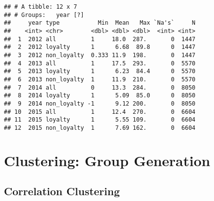 \documentclass[]{article}
\newenvironment{Shaded}{\begin{snugshade}}{\end{snugshade}}
\newcommand{\KeywordTok}[1]{\textcolor[rgb]{0.13,0.29,0.53}{\textbf{#1}}}
\newcommand{\DataTypeTok}[1]{\textcolor[rgb]{0.13,0.29,0.53}{#1}}
\newcommand{\StringTok}[1]{\textcolor[rgb]{0.31,0.60,0.02}{#1}}
\newcommand{\OperatorTok}[1]{\textcolor[rgb]{0.81,0.36,0.00}{\textbf{#1}}}
\newcommand{\NormalTok}[1]{#1}
\begin{document}
\begin{verbatim}
## # A tibble: 12 x 7
## # Groups:   year [?]
##     year type           Min  Mean   Max `Na's`     N
##    <int> <chr>        <dbl> <dbl> <dbl>  <int> <int>
##  1  2012 all          1     18.0  287.       0  1447
##  2  2012 loyalty      1      6.68  89.8      0  1447
##  3  2012 non_loyalty  0.333 11.9  198.       0  1447
##  4  2013 all          1     17.5  293.       0  5570
##  5  2013 loyalty      1      6.23  84.4      0  5570
##  6  2013 non_loyalty  1     11.9  210.       0  5570
##  7  2014 all          0     13.3  284.       0  8050
##  8  2014 loyalty      1      5.09  85.0      0  8050
##  9  2014 non_loyalty -1      9.12 200.       0  8050
## 10  2015 all          1     12.4  270.       0  6604
## 11  2015 loyalty      1      5.55 109.       0  6604
## 12  2015 non_loyalty  1      7.69 162.       0  6604
\end{verbatim}

\section{Clustering: Group
Generation}\label{clustering-group-generation}

\subsection{Correlation Clustering}\label{correlation-clustering}

\begin{Shaded}
\end{Shaded}
\end{document}
